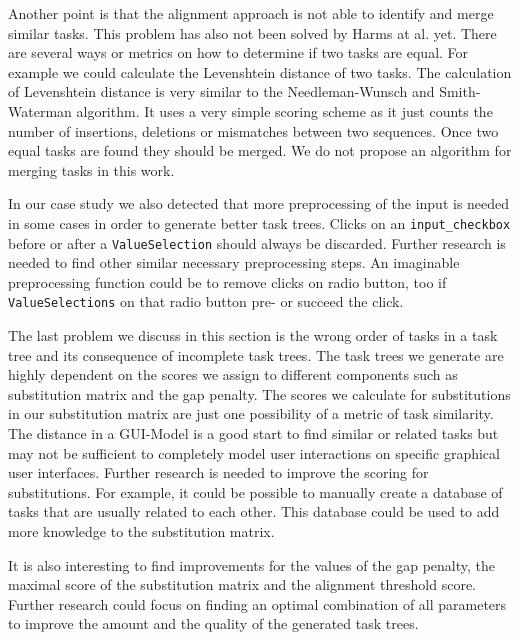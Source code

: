Another point is that the alignment approach is not able to identify and merge similar tasks. 
This problem has also not been solved by Harms at al. yet. 
There are several ways or metrics on how to determine if two tasks are equal.
For example we could calculate the Levenshtein distance of two tasks. 
The calculation of Levenshtein distance is very similar to the Needleman-Wunsch and Smith-Waterman algorithm. 
It uses a very simple scoring scheme as it just counts the number of insertions, deletions or mismatches between two sequences.
Once two equal tasks are found they should be merged. 
We do not propose an algorithm for merging tasks in this work.

In our case study we also detected that more preprocessing of the input is needed in some cases in order to generate better task trees.
Clicks on an \texttt{input\_checkbox} before or after a \texttt{ValueSelection} should always be discarded. 
Further research is needed to find other similar necessary preprocessing steps. 
An imaginable preprocessing function could be to remove clicks on radio button, too if \texttt{ValueSelections} on that radio button pre- or succeed the click.

The last problem we discuss in this section is the wrong order of tasks in a task tree and its consequence of incomplete task trees.
The task trees we generate are highly dependent on the scores we assign to different components such as substitution matrix and the gap penalty.
The scores we calculate for substitutions in our substitution matrix are just one possibility of a metric of task similarity. 
The distance in a GUI-Model is a good start to find similar or related tasks but may not be sufficient to completely model user interactions on specific graphical user interfaces.
Further research is needed to improve the scoring for substitutions. 
For example, it could be possible to manually create a database of tasks that are usually related to each other.
This database could be used to add more knowledge to the substitution matrix.

It is also interesting to find improvements for the values of the gap penalty, the maximal score of the substitution matrix and the alignment threshold score.
Further research could focus on finding an optimal combination of all parameters to improve the amount and the quality of the generated task trees.



